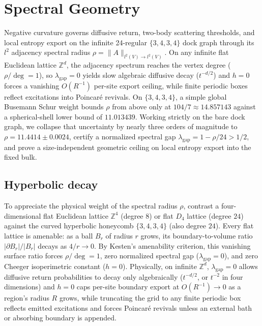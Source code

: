 \section{Spectral Geometry}
\label{sec:spectral}

Negative curvature governs diffusive return, two-body scattering thresholds, and local entropy export on the infinite
24-regular $\{3,4,3,4\}$ dock graph through its $l^2$ adjacency spectral radius $\rho = \|A\|_{l^2(V) \to l^2(V)}$.
On any infinite flat Euclidean lattice $\mathbb{Z}^d$, the adjacency spectrum reaches the vertex degree ($\rho/\deg = 1$),
so $\lambda_{\mathrm{gap}} = 0$ yields slow algebraic diffusive decay ($t^{-d/2}$) and $h = 0$ forces a vanishing
$O(R^{-1})$ per-site export ceiling, while finite periodic boxes reflect excitations into Poincar\'e revivals. On
$\{3,4,3,4\}$, a simple global Busemann Schur weight bounds $\rho$ from above only at $104/7 \approx 14.857143$ against a
spherical-shell lower bound of $11.013439$. Working strictly on the bare dock graph, we collapse that uncertainty by nearly
three orders of magnitude to $\rho = 11.4414 \pm 0.0024$, certify a normalized spectral gap
$\lambda_{\mathrm{gap}} = 1 - \rho/24 > 1/2$, and prove a size-independent geometric ceiling on local entropy export into
the fixed bulk.

\subsection{Hyperbolic decay}

To appreciate the physical weight of the spectral radius $\rho$, contrast a four-dimensional flat Euclidean lattice
$\mathbb{Z}^4$ (degree $8$) or flat $D_4$ lattice (degree $24$) against the curved hyperbolic honeycomb $\{3,4,3,4\}$
(also degree $24$). Every flat lattice is amenable: as a ball $B_r$ of radius $r$ grows, its boundary-to-volume ratio
$|\partial B_r|/|B_r|$ decays as $4/r \to 0$. By Kesten's amenability criterion, this vanishing surface ratio forces
$\rho/\deg = 1$, zero normalized spectral gap ($\lambda_{\mathrm{gap}} = 0$), and zero Cheeger isoperimetric constant
($h = 0$). Physically, on infinite $\mathbb{Z}^d$, $\lambda_{\mathrm{gap}} = 0$ allows diffusive return probabilities to
decay only algebraically ($t^{-d/2}$, or $t^{-2}$ in four dimensions) and $h = 0$ caps per-site boundary export at
$O(R^{-1}) \to 0$ as a region's radius $R$ grows, while truncating the grid to any finite periodic box reflects emitted
excitations and forces Poincar\'e revivals unless an external bath or absorbing boundary is appended.

